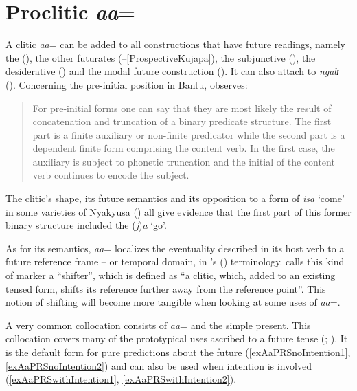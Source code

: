 \section{Proclitic \textit{aa}=}\label{ProcliticAa}
A clitic \textit{aa}= can be added to all constructions that have future readings, namely the  (), the other futurates (--\ref{ProspectiveKujapa}), the subjunctive (), the desiderative () and the modal future construction (). It can also attach to  \textit{ngalɪ} (). Concerning the pre-initial position in Bantu, \citeauthor{GueldemannT2003} observes:
\begin{quote}
For pre-initial forms one can say that they are most likely the result of concatenation and truncation of a binary predicate structure. The first part is a finite auxiliary or non-finite predicator while the second part is a dependent finite form comprising the content verb. In the first case, the auxiliary is subject to phonetic truncation and the initial of the content verb continues to encode the subject.  \citep[186]{GueldemannT2003}
\end{quote}
The clitic's shape, its future semantics and its opposition to a  form of \textit{isa} `come' in some varieties of Nyakyusa () all give evidence that the first part of this former binary structure included the  (\textit{j})\textit{a} `go'.

As for its semantics, \textit{aa}= localizes the eventuality described in its host verb to a future reference frame -- or temporal domain, in \citeauthor{BotneRKershnerT2008}'s (\citeyear{BotneRKershnerT2008}) terminology. \citet[316]{NurseD2008} calls this kind of marker a ``shifter'', which is defined as ``a clitic, which, added to an existing tensed form, shifts its reference further away from the reference point''. This notion of shifting will become more tangible when looking at some uses of \textit{aa}=.

A very common collocation consists of \textit{aa}= and the simple present. This collocation covers many of the prototypical uses ascribed to a future tense (\citealt{DahlOe1985}; \citeyear{DahlOe2000b}). It is the default form for pure predictions about the future (\ref{exAaPRSnoIntention1}, \ref{exAaPRSnoIntention2}) and can also be used when intention is involved (\ref{exAaPRSwithIntention1}, \ref{exAaPRSwithIntention2}).
 
